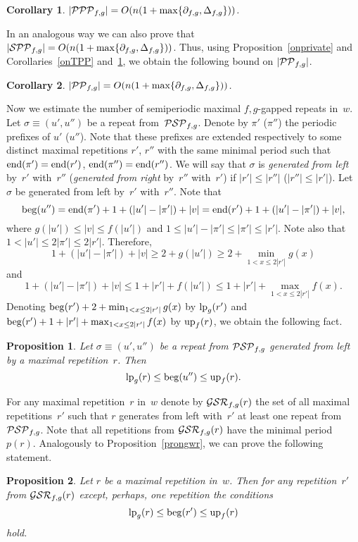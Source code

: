 \documentclass{article}
\newtheorem{proposition}{Proposition}
\newtheorem{corollary}{Corollary}
\begin{document}
\begin{corollary}
$|{\cal PPP}_{f,g}|=O(n(1+\max\{\partial_{f, g}, \Delta_{f, g}\}))$.
\label{onPPP}
\end{corollary}

In an analogous way we can also prove that $|{\cal SPP}_{f,g}|=O(n(1+\max\{\partial_{f, g}, \Delta_{f, g}\}))$.
Thus, using Proposition~\ref{onprivate} and Corollaries~\ref{onTPP} and~\ref{onPPP},
we obtain the following bound on $|{\cal PP}_{f,g}|$.

\begin{corollary}
$|{\cal PP}_{f,g}|=O(n(1+\max\{\partial_{f, g}, \Delta_{f, g}\}))$.
\label{onPP} 
\end{corollary}

Now we estimate the number of semiperiodic maximal $f,g$-gapped repeats in~$w$. 
Let $\sigma\equiv (u', u'')$ be a repeat from~${\cal PSP}_{f,g}$. Denote by $\pi'$ ($\pi''$)
the periodic prefixes of $u'$ ($u''$). Note that these prefixes are extended 
respectively to some distinct maximal repetitions $r'$, $r''$ with the same 
minimal period such that ${\rm end} (\pi')={\rm end} (r')$, ${\rm end} (\pi'')={\rm end} (r'')$.
We will say that $\sigma$ is {\it generated from left} by~$r'$ with~$r''$ 
({\it generated from right} by~$r''$ with~$r'$) if $|r'|\le |r''|$ ($|r''|\le |r'|$).
Let $\sigma$ be generated from left by~$r'$ with~$r''$. Note that
$$
{\rm beg}(u'')={\rm end} (\pi')+1+(|u'|-|\pi'|)+|v|={\rm end} (r')+1+(|u'|-|\pi'|)+|v|,
$$
where $g(|u'|)\le |v|\le f(|u'|)$ and $1\le |u'|-|\pi'|\le |\pi'|\le |r'|$. 
Note also that $1<|u'|\le 2|\pi'|\le 2|r'|$. Therefore,
$$
1+(|u'|-|\pi'|)+|v|\ge 2+g(|u'|)\ge 2+\min_{1< x\le 2|r'|}g(x)
$$
and
$$
1+(|u'|-|\pi'|)+|v|\le 1+|r'|+f(|u'|)\le 1+|r'|+\max_{1< x\le 2|r'|}f(x).
$$
Denoting ${\rm beg} (r')+2+\min_{1< x\le 2|r'|}g(x)$ by ${\rm lp}_g (r')$ 
and ${\rm beg} (r')+1+|r'|+\max_{1< x\le 2|r'|}f(x)$ by ${\rm up}_f (r)$,
we obtain the following fact.
\begin{proposition}
Let $\sigma\equiv (u', u'')$ be a repeat from ${\cal PSP}_{f,g}$ generated
from left by a maximal repetition~$r$. Then
$$
{\rm lp}_g (r)\le {\rm beg} (u'')\le {\rm up}_f (r).
$$
\label{pronbgu}
\end{proposition}

For any maximal repetition~$r$ in~$w$ denote by ${\cal GSR}_{f,g} (r)$ the set
of all maximal repetitions~$r'$ such that $r$ generates from left with~$r'$ at 
least one repeat from~${\cal PSP}_{f,g}$. Note that all repetitions from 
${\cal GSR}_{f,g} (r)$ have the minimal period $p(r)$. Analogously to 
Proposition~\ref{prongwr}, we can prove the following statement.
\begin{proposition}
Let $r$ be a maximal repetition in~$w$. Then for any repetition~$r'$ from 
${\cal GSR}_{f,g} (r)$ except, perhaps, one repetition the conditions
$$
{\rm lp}_g (r)\le {\rm beg} (r')\le {\rm up}_f (r)
$$
hold.
\label{prongsr}
\end{proposition}
\end{document}
